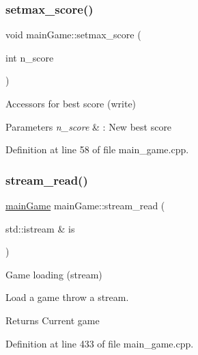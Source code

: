 \subsubsection{\texorpdfstring{setmax\+\_\+score()}{setmax\_score()}}
{\footnotesize\ttfamily void main\+Game\+::setmax\+\_\+score (\begin{DoxyParamCaption}\item[{int}]{n\+\_\+score }\end{DoxyParamCaption})}



Accessors for best score (write) 


\begin{DoxyParams}{Parameters}
{\em n\+\_\+score} & \+: New best score \\
\hline
\end{DoxyParams}


Definition at line 58 of file main\+\_\+game.\+cpp.

\hypertarget{classmain_game_abfd0428b0caf9a180494db57fc4df7c3}{}\label{classmain_game_abfd0428b0caf9a180494db57fc4df7c3} 
\subsubsection{\texorpdfstring{stream\+\_\+read()}{stream\_read()}}
{\footnotesize\ttfamily \hyperlink{classmain_game}{main\+Game} main\+Game\+::stream\+\_\+read (\begin{DoxyParamCaption}\item[{std\+::istream \&}]{is }\end{DoxyParamCaption})\hspace{0.3cm}{\ttfamily [static]}}



Game loading (stream) 

Load a game throw a stream.

\begin{DoxyReturn}{Returns}
Current game 
\end{DoxyReturn}


Definition at line 433 of file main\+\_\+game.\+cpp.

\hypertarget{classmain_game_a29dc58fda69f709f1c34a3aa57955fb2}{}\label{classmain_game_a29dc58fda69f709f1c34a3aa57955fb2} 
